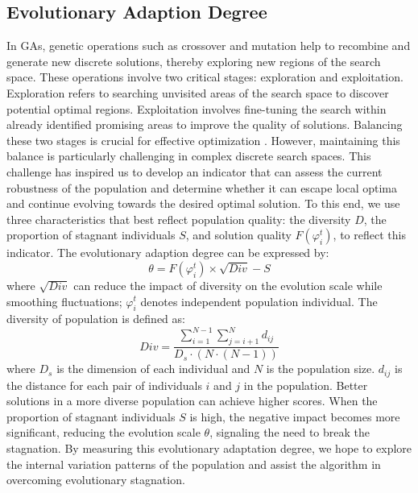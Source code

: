 \documentclass[journal,twoside]{IEEEtran}
\begin{document}
\subsection{Evolutionary Adaption Degree}
In GAs, genetic operations such as crossover and mutation help to recombine and generate new discrete solutions, thereby exploring new regions of the search space. These operations involve two critical stages: exploration and exploitation. Exploration refers to searching unvisited areas of the search space to discover potential optimal regions. Exploitation involves fine-tuning the search within already identified promising areas to improve the quality of solutions. Balancing these two stages is crucial for effective optimization \cite{10010703}. However, maintaining this balance is particularly challenging in complex discrete search spaces. This challenge has inspired us to develop an indicator that can assess the current robustness of the population and determine whether it can escape local optima and continue evolving towards the desired optimal solution. To this end, we use three characteristics that best reflect population quality: the diversity $D$, the proportion of stagnant individuals $S$, and solution quality $F\left(\varphi_i^t\right)$, to reflect this indicator. The evolutionary adaption degree can be expressed by:
\begin{equation}\label{E11}
	\theta= F\left(\varphi_i^t\right) \times \sqrt{Div}- S 
\end{equation}
where $\sqrt{Div}$ can reduce the impact of diversity on the evolution scale while smoothing fluctuations; $\varphi_i^t$ denotes independent population individual. The diversity of population is defined as: 
\begin{equation}\label{E12}
	Div = \frac{\sum_{i=1}^{N-1} \sum_{j=i+1}^{N} d_{ij}}{D_s \cdot (N \cdot (N - 1))}
\end{equation}
 where $D_s$ is the dimension of each individual and $N$ is the population size. $d_{ij}$ is the distance for each pair of individuals $i$ and $j$ in the population. Better solutions in a more diverse population can achieve higher scores. When the proportion of stagnant individuals $S$ is high, the negative impact becomes more significant, reducing the evolution scale $\theta$, signaling the need to break the stagnation. By measuring this evolutionary adaptation degree, we hope to explore the internal variation patterns of the population and assist the algorithm in overcoming evolutionary stagnation.
\end{document}
